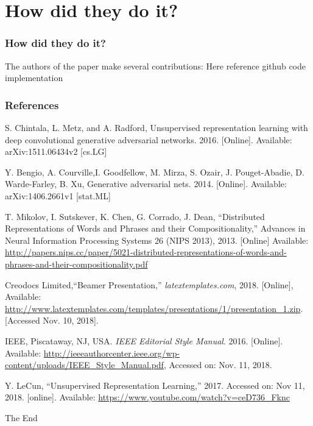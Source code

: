 \documentclass{beamer}
\begin{document}
\section{How did they do it?}
\begin{frame}
\frametitle{How did they do it?}
The authors of the paper make several contributions:
Here reference github code implementation
\end{frame}



\begin{frame}
\frametitle{References}
\footnotesize{
\begin{thebibliography}{99} %
 S. Chintala, L. Metz, and A. Radford, 
Unsupervised representation learning with deep convolutional generative 
adversarial networks.  2016. [Online]. Available: arXiv:1511.06434v2 [cs.LG]
 
 Y. Bengio, A. Courville,I. Goodfellow, M. Mirza, S. Ozair,  
J. Pouget-Abadie,  D. Warde-Farley, B. Xu, Generative adversarial nets. 2014. 
[Online]. Available: arXiv:1406.2661v1 [stat.ML]

 T. Mikolov, I. Sutskever, K. Chen, G. Corrado, J. Dean,
``Distributed Representations of Words and Phrases and their Compositionality,''
Advances in Neural Information Processing Systems 26 (NIPS 2013), 2013. 
[Online] Available: \url{http://papers.nips.cc/paper/5021-distributed-representations-of-words-and-phrases-and-their-compositionality.pdf}

 Creodocs Limited,``Beamer Presentation,''
\emph{latextemplates.com}, 2018. [Online], Available: 
\url{http://www.latextemplates.com/templates/presentations/1/presentation_1.zip}. [Accessed Nov. 10, 2018].

 IEEE, Piscataway, NJ, USA. \emph{IEEE Editorial Style Manual}. 2016.
[Online]. Available: \url{http://ieeeauthorcenter.ieee.org/wp-content/uploads/IEEE_Style_Manual.pdf}, Accessed on: Nov. 11, 2018.

 Y. LeCun, ``Unsupervised Representation Learning,''
2017. Accessed on: Nov 11, 2018. [online]. Available: \url{https://www.youtube.com/watch?v=ceD736_Fknc}  
\end{thebibliography}
}
\end{frame}


\begin{frame}
\Huge{\centerline{The End}}
\end{frame}

\end{document}
